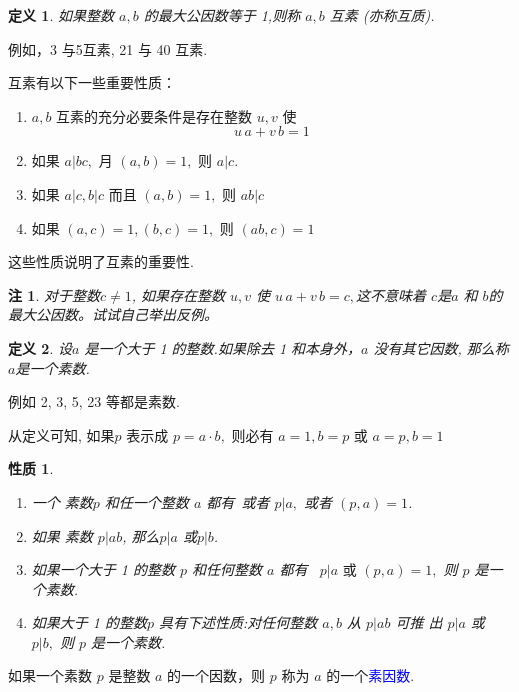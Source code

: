 \documentclass[13pt,punct]{ctexbeamer}
\newtheorem*{defi}{定义}
\newtheorem*{rem}{注}
\newtheorem*{prop}{性质}
\newcommand{\blue}{\textcolor{blue}}
\begin{document}
\begin{frame}
\begin{defi}
	如果整数 $a, b$ 的最大公因数等于 1,则称 $a, b$ \alert{互素} (亦称互质).
\end{defi}
例如，3 与5互素, 21 与 40 互素.

互素有以下一些重要性质：
\begin{enumerate}
\item $a ,b$ 互素的充分必要条件是存在整数 $u, v$ 使
\[
u \, a+v\,  b=1
\]
\item 如果 $a | b c,$ 月 $(a, b)=1,$ 则 $a | c$.
\item 如果 $a|c, b| c$ 而且 $(a, b)=1,$ 则 $a b | c$
\item 如果 $(a, c)=1,(b, c)=1,$ 则 $(a b, c)=1$
\end{enumerate}
这些性质说明了互素的重要性.

\begin{rem}
    对于整数$c\neq 1$, 如果存在整数 $u, v$ 使
$
 u\, a+v\,  b=c,
$这不意味着 $c$是$a$ 和 $b$的最大公因数。试试自己举出反例。
\end{rem}
\end{frame}



 \begin{frame}


\begin{defi}
	设$a$ 是一个大于 1 的整数.如果除去 1 和本身外，$a$ 没有其它因数, 那么称$a$是一个\alert{素数}.
\end{defi}
例如 2, 3, 5, 23 等都是素数.

从定义可知, 如果$p$ 表示成 $p=a \cdot b,$ 则必有 $a=1, b=p$ 或 $a=p, b=1$

\begin{prop}
\begin{enumerate}
\item  一个 素数$p$ 和任一个整数 $a$ 都有~或者 $p | a,$ 或者 $(p, a)=1$.
\item 如果 素数 $p | a  b$, 那么$p | a$ 或$p| b$.
\item  如果一个大于 1  的整数 $p$ 和任何整数 $a$ 都有~  $p | a \text { 或 } (p, a)=1,$ 则 $p$
是一个素数.
\item 如果大于 1 的整数$p$ 具有下述性质:对任何整数 $a , b$ 从 $p | a b$ 可推 出 $p | a$ 或 $p | b,$ 则 $p$ 是一个素数.
\end{enumerate}
\end{prop}
如果一个素数  $p$ 是整数 $a$ 的一个因数，则 $p$ 称为 $a$ 的一个\blue{素因数}.
 \end{frame}
\end{document}
